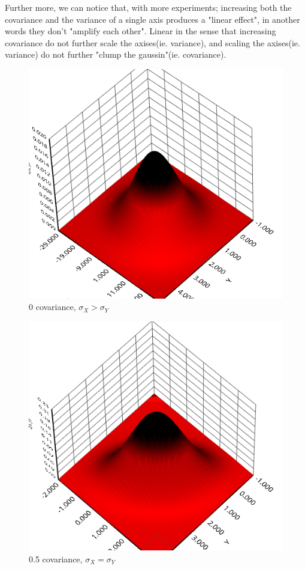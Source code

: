 \documentclass[12pt]{article}
\begin{document}
Further more, we can notice that, with more experiments; increasing both the covariance and the variance of a single axis produces a "linear effect", in another words they don't "amplify each other". Linear in the sense that increasing covariance do not further scale the axises(ie. variance), and scaling the axises(ie. variance) do not further "clump the gaussin"(ie. covariance).\\

\begin{figure}
  \includegraphics[width=\linewidth]{1.png}
  \caption{ 0 covariance, $\sigma_X > \sigma_Y$}
  \label{fig:boat1}
\end{figure}


\begin{figure}
  \includegraphics[width=\linewidth]{2.png}
  \caption{ 0.5 covariance, $\sigma_X = \sigma_Y$}
  \label{fig:boat2}
\end{figure}
\end{document}
